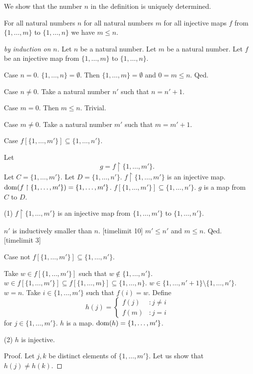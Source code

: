 \documentclass{article}
\newcommand{\Seq}[2]{\{#1,\dots,#2\}}
\begin{document}
  We show that the number $n$ in the definition is uniquely
  determined.
  \begin{forthel}

  \begin{lemma}
  For all natural numbers $n$
  for all natural numbers $m$
  for all injective maps $f$ from
  $\Seq{1}{m}$ to $\Seq{1}{n}$ we have $m \leq n$.
  \end{lemma}
  \begin{proof}[by induction on $n$]
  Let $n$ be a natural number.
  Let $m$ be a natural number.
  Let $f$ be an injective map from $\Seq{1}{m}$ to $\Seq{1}{n}$.

  Case $n=0$. $\Seq{1}{n} = \emptyset$. Then $\Seq{1}{m} = \emptyset$ and
  $0 = m \leq n$. Qed.

  Case $n \neq 0$.
  Take a natural number $n'$ such that $n = n' + 1$.

  Case $m = 0$. Then $m \leq n$. Trivial.

  Case $m \neq 0$.
  Take a natural number $m'$ such that $m = m' + 1$.

  Case $f[\Seq{1}{m'}] \subseteq \Seq{1}{n'}$.

  Let
$$g = f \upharpoonright \Seq{1}{m'}.$$
  Let $C = \Seq{1}{m'}$. Let $D = \Seq{1}{n'}$.
  $f \upharpoonright \Seq{1}{m'}$ is an injective map.
  $\dom(f \upharpoonright \Seq{1}{m'}) = \Seq{1}{m'}$.
  $f[\Seq{1}{m'}] \subseteq \Seq{1}{n'}$.
  $g$ is a map
  from $C$ to $D$.

  (1) $f \upharpoonright \Seq{1}{m'}$ is an injective map
  from $\Seq{1}{m'}$ to $\Seq{1}{n'}$.

  $n'$ is inductively smaller than $n$.
[timelimit 10] %
  $m' \leq n'$ and $m \leq n$. Qed.
[timelimit 3] %

  Case not $f[\Seq{1}{m'}] \subseteq \Seq{1}{n'}$.

  Take $w \in f[\Seq{1}{m'}]$ such that $w \notin \Seq{1}{n'}$.
  $w \in f[\Seq{1}{m'}] \subseteq f[\Seq{1}{m}] \subseteq \Seq{1}{n}$.
  $w \in \Seq{1}{n'+1} \setminus \Seq{1}{n'}$.
  $w = n$.
  Take $i \in \Seq{1}{m'}$ such that $f(i) = w$.
  Define
  \[h(j) =
    \begin{cases}
    f(j)  & : j \neq i \\
    f(m) & : j = i
    \end{cases} \]
  for $j \in \Seq{1}{m'}$.
  $h$ is a map. $\dom(h) = \Seq{1}{m'}$.

  (2) $h$ is injective.

  Proof.
  Let $j,k$ be distinct elements of $\Seq{1}{m'}$.
  Let us show that $h(j) \neq h(k)$.


\end{proof}
\end{forthel}
\end{document}
